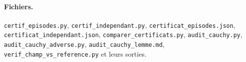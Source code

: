 \documentclass[11pt,a4paper]{article}
\theoremstyle{remark}
\begin{document}
\paragraph{Fichiers.} \texttt{certif\_episodes.py}, \texttt{certif\_independant.py}, \texttt{certificat\_episodes.json}, \texttt{certificat\_independant.json}, \texttt{comparer\_certificats.py}, \texttt{audit\_cauchy.py}, \texttt{audit\_cauchy\_adverse.py}, \texttt{audit\_cauchy\_lemme.md}, \texttt{verif\_champ\_vs\_reference.py} et leurs sorties.
\end{document}
